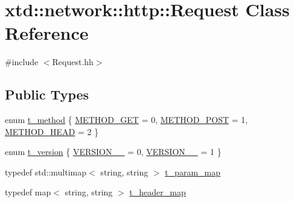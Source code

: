 \hypertarget{classxtd_1_1network_1_1http_1_1Request}{}\section{xtd\+:\+:network\+:\+:http\+:\+:Request Class Reference}
\label{classxtd_1_1network_1_1http_1_1Request}


{\ttfamily \#include $<$Request.\+hh$>$}

\subsection*{Public Types}
\begin{DoxyCompactItemize}
\item 
enum \hyperlink{classxtd_1_1network_1_1http_1_1Request_a789d6d688af4e63cc725542fc7925627}{t\+\_\+method} \{ \hyperlink{classxtd_1_1network_1_1http_1_1Request_a789d6d688af4e63cc725542fc7925627a211feb11ea0c6defc080b91b8174ced6}{M\+E\+T\+H\+O\+D\+\_\+\+G\+ET} = 0, 
\hyperlink{classxtd_1_1network_1_1http_1_1Request_a789d6d688af4e63cc725542fc7925627ab832c767db7682c75bc4aa0d169b47cb}{M\+E\+T\+H\+O\+D\+\_\+\+P\+O\+ST} = 1, 
\hyperlink{classxtd_1_1network_1_1http_1_1Request_a789d6d688af4e63cc725542fc7925627a71ee8e01b676b10c098c9a9ccf53b414}{M\+E\+T\+H\+O\+D\+\_\+\+H\+E\+AD} = 2
 \}
\item 
enum \hyperlink{classxtd_1_1network_1_1http_1_1Request_ad1842a3667ff0a96222bb69262cda536}{t\+\_\+version} \{ \hyperlink{classxtd_1_1network_1_1http_1_1Request_ad1842a3667ff0a96222bb69262cda536ab4d3cfdefe25102548725517f983894f}{V\+E\+R\+S\+I\+O\+N\+\_\+\_} = 0, 
\hyperlink{classxtd_1_1network_1_1http_1_1Request_ad1842a3667ff0a96222bb69262cda536a78aeac842cfaa7d2ffe8ad53a630476d}{V\+E\+R\+S\+I\+O\+N\+\_\+\_} = 1
 \}
\item 
typedef std\+::multimap$<$ string, string $>$ \hyperlink{classxtd_1_1network_1_1http_1_1Request_a3cd6e9ac7c35897002582c4a3b84b17d}{t\+\_\+param\+\_\+map}
\item 
typedef map$<$ string, string $>$ \hyperlink{classxtd_1_1network_1_1http_1_1Request_aeaf2a69c884e81983aebaf36518c310e}{t\+\_\+header\+\_\+map}
\end{DoxyCompactItemize}
